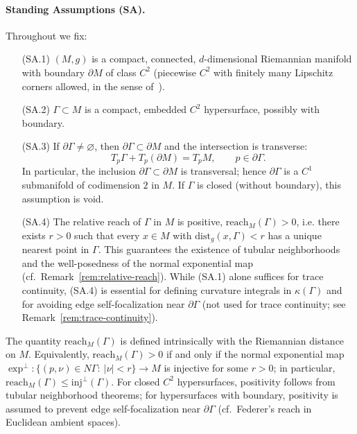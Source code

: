 \paragraph{Standing Assumptions (SA).}
Throughout we fix:
\begin{itemize}
  \item[(SA.1)] $(M,g)$ is a compact, connected, $d$-dimensional Riemannian manifold
  with boundary $\partial M$ of class $C^2$ (piecewise $C^2$ with finitely many Lipschitz corners allowed, in the sense of~\cite{Grisvard1985}).
  \item[(SA.2)] $\Gamma \subset M$ is a compact, embedded $C^2$ hypersurface, possibly with boundary.
  \item[(SA.3)] If $\partial\Gamma \neq \varnothing$, then $\partial\Gamma \subset \partial M$ and the intersection is transverse:
  \[
  T_p\Gamma + T_p(\partial M) = T_p M, \qquad p\in \partial\Gamma.
  \]
  In particular, the inclusion $\partial\Gamma\subset\partial M$ is transversal; hence $\partial\Gamma$ is a $C^1$ submanifold of codimension $2$ in $M$. If $\Gamma$ is closed (without boundary), this assumption is void.
  \item[(SA.4)] The relative reach of $\Gamma$ in $M$ is positive, $\mathrm{reach}_M(\Gamma)>0$, i.e. there exists $r>0$ such that every $x\in M$ with $\mathrm{dist}_g(x,\Gamma)<r$ has a unique nearest point in $\Gamma$.
  This guarantees the existence of tubular neighborhoods and the well-posedness of the normal exponential map (cf.\ Remark~\ref{rem:relative-reach}).
  While (SA.1) alone suffices for trace continuity, (SA.4) is essential for defining curvature integrals in $\kappa(\Gamma)$ and for avoiding edge self-focalization near $\partial\Gamma$ (not used for trace continuity; see Remark~\ref{rem:trace-continuity}).
\end{itemize}

\begin{remark}\label{rem:relative-reach}
The quantity $\mathrm{reach}_M(\Gamma)$ is defined intrinsically with the Riemannian distance on $M$.
Equivalently, $\mathrm{reach}_M(\Gamma)>0$ if and only if the normal exponential map
$\exp^\perp:\{(p,\nu)\in N\Gamma:\ |\nu|<r\}\to M$ is injective for some $r>0$; in particular,
$\mathrm{reach}_M(\Gamma)\le \mathrm{inj}^\perp(\Gamma)$.
For closed $C^2$ hypersurfaces, positivity follows from tubular neighborhood theorems;
for hypersurfaces with boundary, positivity is assumed to prevent edge self-focalization near $\partial\Gamma$ (cf.\ Federer’s reach in Euclidean ambient spaces).
\end{remark}

